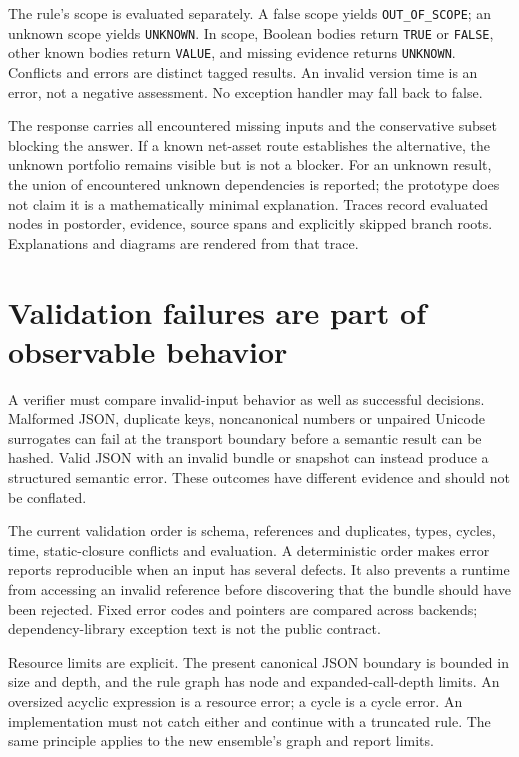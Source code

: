 \documentclass[12pt,a4paper,oneside,openany]{book}
\begin{document}
The rule's scope is evaluated separately. A false scope yields
\texttt{OUT\_OF\_SCOPE}; an unknown scope yields \texttt{UNKNOWN}. In scope,
Boolean bodies return \texttt{TRUE} or \texttt{FALSE}, other known bodies return
\texttt{VALUE}, and missing evidence returns \texttt{UNKNOWN}. Conflicts and
errors are distinct tagged results. An invalid version time is an error, not a
negative assessment. No exception handler may fall back to false.

The response carries all encountered missing inputs and the conservative subset
blocking the answer. If a known net-asset route establishes the alternative,
the unknown portfolio remains visible but is not a blocker. For an unknown
result, the union of encountered unknown dependencies is reported; the prototype
does not claim it is a mathematically minimal explanation. Traces record evaluated
nodes in postorder, evidence, source spans and explicitly skipped branch roots.
Explanations and diagrams are rendered from that trace.

\section{Validation failures are part of observable behavior}
\label{merge:M07:04}


A verifier must compare invalid-input behavior as well as successful decisions.
Malformed JSON, duplicate keys, noncanonical numbers or unpaired Unicode
surrogates can fail at the transport boundary before a semantic result can be
hashed. Valid JSON with an invalid bundle or snapshot can instead produce a
structured semantic error. These outcomes have different evidence and should
not be conflated.

The current validation order is schema, references and duplicates, types, cycles,
time, static-closure conflicts and evaluation. A deterministic order makes error
reports reproducible when an input has several defects. It also prevents a
runtime from accessing an invalid reference before discovering that the bundle
should have been rejected. Fixed error codes and pointers are compared across
backends; dependency-library exception text is not the public contract.

Resource limits are explicit. The present canonical JSON boundary is bounded in
size and depth, and the rule graph has node and expanded-call-depth limits. An
oversized acyclic expression is a resource error; a cycle is a cycle error. An
implementation must not catch either and continue with a truncated rule. The
same principle applies to the new ensemble's graph and report limits.
\end{document}
